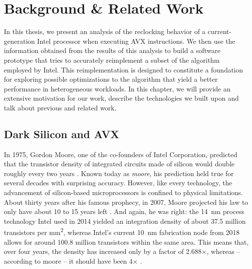 \chapter{Background \& Related Work}
\label{sec:background}

In this thesis, we present an analysis of the reclocking behavior of a current-generation Intel processor when executing \gls{AVX} instructions. We then use the information obtained from the results of this analysis to build a software prototype that tries to accurately reimplement a subset of the algorithm employed by Intel. This reimplementation is designed to constitute a foundation for exploring possible optimizations to the algorithm that yield a better performance in heterogeneous workloads. In this chapter, we will provide an extensive motivation for our work, describe the technologies we built upon and talk about previous and related work.

\section{Dark Silicon and AVX}
\label{sec:background:motivation}

In 1975, Gordon Moore, one of the co-founders of Intel Corporation, predicted that the transistor density of integrated circuits made of silicon would double roughly every two years \cite{moore1975progress}. Known today as \emph{\gls{moore}}, his prediction held true for several decades with surprising accuracy. However, like every technology, the advancement of silicon-based microprocessors is confined to physical limitations. About thirty years after his famous prophecy, in 2007, Moore projected his law to only have about 10 to 15 years left \cite{moore2007interview}. And again, he was right: the \SI{14}{\nano\meter} process technology Intel used in 2014 yielded an integration density of about 37.5 million transistors per \si{\milli\meter\squared}, whereas Intel's current \SI{10}{\nano\meter} fabrication node from 2018 allows for around 100.8 million transistors within the same area. This means that, over four years, the density has increased only by a factor of 2.688$\times$, whereas -- according to \gls{moore} -- it should have been 4$\times$ \cite{courtland2017intel}.

